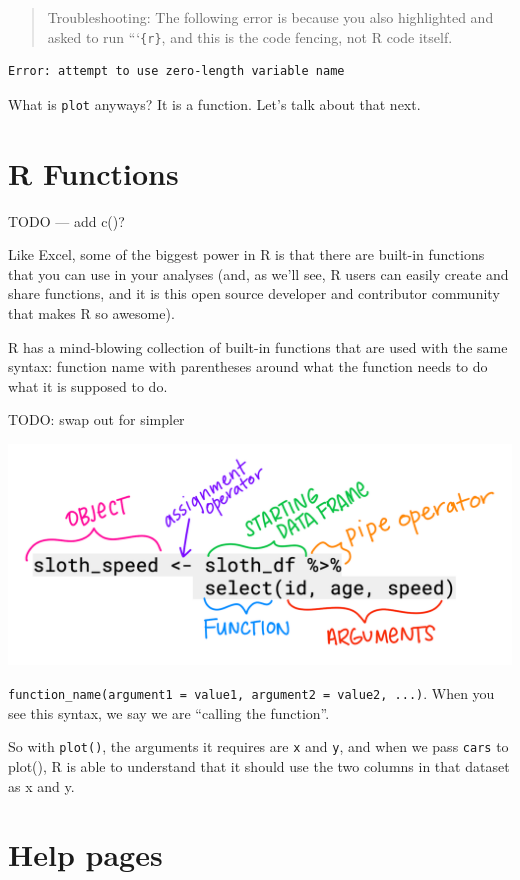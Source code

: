 \documentclass[]{book}
\begin{document}
\begin{quote}
Troubleshooting: The following error is because you also highlighted and asked to run ```\texttt{\{r\}}, and this is the code fencing, not R code itself.
\end{quote}

\begin{verbatim}
Error: attempt to use zero-length variable name
\end{verbatim}

What is \texttt{plot} anyways? It is a function. Let's talk about that next.

\hypertarget{r-functions}{%
\section{R Functions}\label{r-functions}}

TODO --- add c()?

Like Excel, some of the biggest power in R is that there are built-in functions that you can use in your analyses (and, as we'll see, R users can easily create and share functions, and it is this open source developer and contributor community that makes R so awesome).

R has a mind-blowing collection of built-in functions that are used with the same syntax: function name with parentheses around what the function needs to do what it is supposed to do.

TODO: swap out for simpler

\includegraphics[width=0.6\linewidth]{img/horst-naming-terms}

\texttt{function\_name(argument1\ =\ value1,\ argument2\ =\ value2,\ ...)}. When you see this syntax, we say we are ``calling the function''.

So with \texttt{plot()}, the arguments it requires are \texttt{x} and \texttt{y}, and when we pass \texttt{cars} to plot(), R is able to understand that it should use the two columns in that dataset as x and y.

\hypertarget{help-pages}{%
\section{Help pages}\label{help-pages}}
\end{document}
